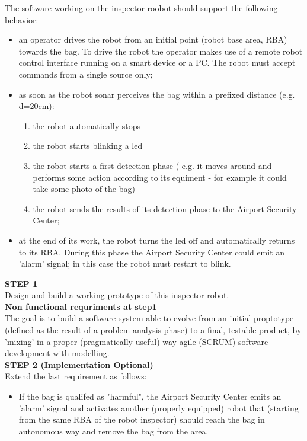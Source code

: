 \documentclass{llncs}
\begin{document}
The software working on the inspector-roobot should support the following behavior:
\begin{itemize}
\item an operator drives the robot from an initial point (robot base area, RBA) towards the bag. To drive the robot the operator makes use of a remote robot control interface running on a smart device or a PC. The robot must accept commands from a single source only;
\item as soon as the robot sonar perceives the bag within a prefixed distance (e.g. d=20cm):
\begin{enumerate}
\item the robot automatically stops
\item the robot starts blinking a led
\item the robot starts a first detection phase ( e.g. it moves around and performs some action according to its equiment - for example it could take some photo of the bag)
\item the robot sends the results of its detection phase to the Airport Security Center;
\end{enumerate}
\item at the end of its work, the robot turns the led off and automatically returns to its RBA. During this phase the Airport Security Center could emit an 'alarm' signal; in this case the robot must restart to blink.
\end{itemize} 
\textbf{STEP 1}\\
Design and build a working prototype of this inspector-robot.\\
\textbf{Non functional requriments at step1}\\
The goal is to build a software system able to evolve from an initial proptotype (defined as the result of a problem analysis phase) to a final, testable product, by 'mixing' in a proper (pragmatically useful) way agile (SCRUM) software development with modelling.\\
\textbf{STEP 2 (Implementation Optional)}\\
Extend the last requirement as follows:
\begin{itemize}
\item If the bag is qualifed as "harmful", the Airport Security Center emits an 'alarm' signal and activates another (properly equipped) robot that (starting from the same RBA of the robot inspector) should reach the bag in autonomous way and remove the bag from the area.
\end{itemize}
\end{document}

